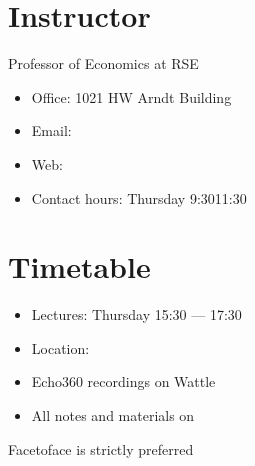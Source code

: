 \documentclass[letterpaper,10pt,english]{jupyterBook}
\begin{document}
\section{Instructor}
\label{\detokenize{01.introduction:instructor}}
\sphinxAtStartPar
{}
Professor of Economics at RSE
\begin{itemize}
\item {} 
\sphinxAtStartPar
Office: 1021 HW Arndt Building

\item {} 
\sphinxAtStartPar
Email: 

\item {} 
\sphinxAtStartPar
Web: 

\item {} 
\sphinxAtStartPar
Contact hours: Thursday 9:30\sphinxhyphen{}11:30

\end{itemize}


\section{Timetable}
\label{\detokenize{01.introduction:timetable}}
\sphinxAtStartPar
{}
\begin{itemize}
\item {} 
\sphinxAtStartPar
Lectures: Thursday 15:30 — 17:30

\item {} 
\sphinxAtStartPar
Location: 

\end{itemize}

\sphinxAtStartPar
{}
\begin{itemize}
\item {} 
\sphinxAtStartPar
Echo\sphinxhyphen{}360 recordings on Wattle

\item {} 
\sphinxAtStartPar
All notes and materials on 

\end{itemize}

\sphinxAtStartPar
Face\sphinxhyphen{}to\sphinxhyphen{}face is strictly preferred
\end{document}
